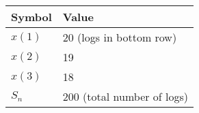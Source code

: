 \begin{tabular}{ | m{1.0cm} | m{4cm} | } 
  \hline
 Symbol & Value \\ 
 \hline
$x(1)$& 20 (logs in bottom row) \\
\hline
$x(2)$ & 19\\ 
\hline
$x(3)$ & 18\\ 
\hline
$S_n$& 200 (total number of logs) \\
\hline
\end{tabular}\\
\caption{}
\label{Table:1}